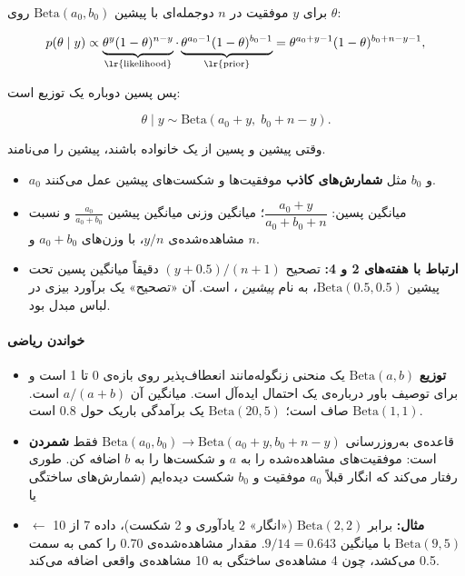 برای \(y\) موفقیت در \(n\)  دوجمله‌ای با پیشین
\(\mathrm{Beta}(a_0, b_0)\) روی \(\theta\):

\[
p(\theta \mid y) \propto \underbrace{\theta^{y}(1-\theta)^{n-y}}_{\text{\lr{likelihood}}} \cdot \underbrace{\theta^{a_0 - 1}(1-\theta)^{b_0 - 1}}_{\text{\lr{prior}}}
= \theta^{a_0 + y - 1}(1-\theta)^{b_0 + n - y - 1},
\]

پس پسین دوباره یک توزیع  است:

\[
\theta \mid y \sim \mathrm{Beta}(a_0 + y,\; b_0 + n - y).
\]

وقتی پیشین و پسین از یک خانواده باشند، پیشین را \textbf{}
می‌نامند.

\begin{itemize}
\tightlist
\item
  \(a_0\) و \(b_0\) مثل \textbf{شمارش‌های کاذب} 
  موفقیت‌ها و شکست‌های پیشین عمل می‌کنند.
\item
  میانگین پسین: \(\dfrac{a_0 + y}{a_0 + b_0 + n}\)؛ میانگین وزنی میانگین
  پیشین \(\frac{a_0}{a_0 + b_0}\) و نسبت مشاهده‌شده‌ی \(y/n\)، با وزن‌های
  \(a_0 + b_0\) و \(n\).
\item
  \textbf{ارتباط با هفته‌های 2 و 4:} تصحیح 
  \((y + 0.5)/(n + 1)\) دقیقاً میانگین پسین تحت پیشین
  \(\mathrm{Beta}(0.5, 0.5)\)، به نام \emph{پیشین }، است.
  آن «تصحیح» یک برآورد بیزی در لباس مبدل بود.
\end{itemize}

\paragraph{خواندن ریاضی}

\begin{itemize}
\tightlist
\item
  \textbf{توزیع } \(\mathrm{Beta}(a, b)\) یک منحنی زنگوله‌مانند
  انعطاف‌پذیر روی بازه‌ی 0 تا 1 است و برای توصیف باور درباره‌ی یک احتمال
  ایده‌آل است. میانگین آن \(a/(a+b)\) است. \(\mathrm{Beta}(1,1)\) صاف
  است؛ \(\mathrm{Beta}(20, 5)\) یک برآمدگی باریک حول 0.8 است.
\item
  قاعده‌ی به‌روزرسانی
  \(\mathrm{Beta}(a_0,\allowbreak b_0) \to \mathrm{Beta}(a_0 + y,\allowbreak b_0 + n - y)\)
  فقط \textbf{شمردن} است: موفقیت‌های مشاهده‌شده را به \(a\) و شکست‌ها را به
  \(b\) اضافه کن.  طوری رفتار می‌کند که انگار قبلاً \(a_0\)
  موفقیت و \(b_0\) شکست دیده‌ایم (شمارش‌های ساختگی یا 
\item
  \textbf{مثال:}  برابر \(\mathrm{Beta}(2, 2)\) («انگار» 2
  یادآوری و 2 شکست)، داده 7 از 10 \ensuremath{\leftarrow} \(\mathrm{Beta}(9, 5)\) با میانگین
  \(9/14 = 0.643\).  مقدار مشاهده‌شده‌ی 0.70 را کمی به سمت 0.5
  می‌کشد، چون 4 مشاهده‌ی ساختگی به 10 مشاهده‌ی واقعی اضافه می‌کند.
\end{itemize}

